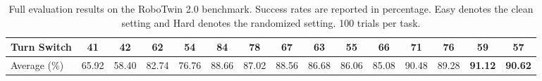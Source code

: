\documentclass{llmxive}
\begin{document}
\begin{table}[tp]
{\begin{tabular}{l*{14}{c}}
        Turn Switch                 & 41 & 42 & 62 & 54 & 84 & 78 & 67 & 63 & 55 & 66 & 71 & 76 & 59 & 57 \\
            \midrule
        Average (\%) & 65.92 & 58.40 & 82.74 & 76.76 & 88.66 & 87.02 & 88.56 & 86.68 & 86.06 & 85.08 & 90.48 & 89.28 & \textbf{91.12} & \textbf{90.62} \\
            \bottomrule
        \end{tabular}
    }
\caption{Full evaluation results on the RoboTwin 2.0 benchmark. Success rates are reported in
    percentage. Easy denotes the clean setting and Hard denotes the randomized setting. 100 trials per
    task.}
\label{tab:robotwin2_full_task_results}
\end{table}
\end{document}
